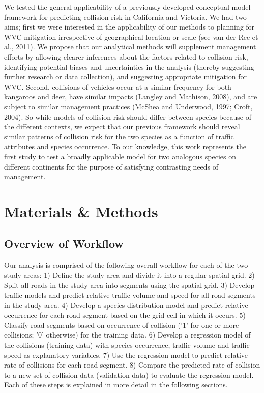 We tested the general applicability of a previously developed conceptual model framework for predicting collision risk in California and Victoria.  We had two aims; first we were interested in the applicability of our methods to planning for WVC mitigation irrespective of geographical location or scale (see van der Ree et al., 2011).  We propose that our analytical methods will supplement management efforts by allowing clearer inferences about the factors related to collision risk, identifying potential biases and uncertainties in the analysis (thereby suggesting further research or data collection), and suggesting appropriate mitigation for WVC.  Second, collisions of vehicles occur at a similar frequency for both kangaroos and deer, have similar impacts (Langley and Mathison, 2008), and are subject to similar management practices (McShea and Underwood, 1997; Croft, 2004).  So while models of collision risk should differ between species because of the different contexts, we expect that our previous framework should reveal similar patterns of collision risk for the two species as a function of traffic attributes and species occurrence.  To our knowledge, this work represents the first study to test a broadly applicable model for two analogous species on different continents for the purpose of satisfying contrasting needs of management.

\section{Materials \& Methods}

\subsection{Overview of Workflow}

Our analysis is comprised of the following overall workflow for each of the two study areas:
1)  Define the study area and divide it into a regular spatial grid.
2)  Split all roads in the study area into segments using the spatial grid.
3)  Develop traffic models and predict relative traffic volume and speed for all road segments in the study area.
4)  Develop a species distribution model and predict relative occurrence for each road segment based on the grid cell in which it occurs.
5)  Classify road segments based on occurrence of collision ('1' for one or more collisions; '0' otherwise) for the training data.
6)  Develop a regression model of the collisions (training data) with species occurrence, traffic volume and traffic speed as explanatory variables.
7)  Use the regression model to predict relative rate of collisions for each road segment.
8)  Compare the predicted rate of collision to a new set of collision data (validation data) to evaluate the regression model.
Each of these steps is explained in more detail in the following sections.

